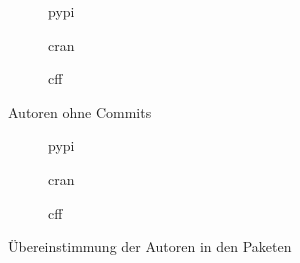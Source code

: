 \begin{figure}[H]
    \begin{subfigure}{.5\textwidth}
        \centering
        
        \caption{\gls{pypi}}
        \label{fig:total_authors_no_commits_pypi}
    \end{subfigure}%
    \begin{subfigure}{.5\textwidth}
        \centering
        
        \caption{\gls{cran}}
        \label{fig:total_authors_no_commits_cran}
    \end{subfigure}
    \centering
    \begin{subfigure}{.5\textwidth}
        \centering
        
        \caption{\gls{cff}}
        \label{fig:total_authors_no_commits_cff}
    \end{subfigure}
    \caption{Autoren ohne Commits}
    \label{fig:total_authors_no_commits_anhang}
\end{figure}

\begin{figure}[H]
    \begin{subfigure}{.5\textwidth}
        \centering
        
        \caption{\gls{pypi}}
        \label{fig:similarity_pypi}
    \end{subfigure}%
    \begin{subfigure}{.5\textwidth}
        \centering
        
        \caption{\gls{cran}}
        \label{fig:similarity_cran}
    \end{subfigure}
    \centering
    \begin{subfigure}{.5\textwidth}
        \centering
        
        \caption{\gls{cff}}
        \label{fig:similarity_cff}
    \end{subfigure}
    \caption{Übereinstimmung der Autoren in den Paketen}
    \label{fig:similarities_anhang}
\end{figure}

